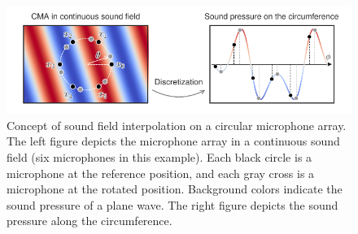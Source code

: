 \documentclass[sip,biber]{now-journal}
\begin{document}
\begin{figure}[t]
  \centering
  \includegraphics{figures/diagrams/sfi.pdf}
  \caption{%
    Concept of sound field interpolation on a circular microphone array.
    The left figure depicts the microphone array in a continuous sound field (six microphones in this example).
    Each black circle is a microphone at the reference position, and each gray cross is a microphone at the rotated position.
    Background colors indicate the sound pressure of a plane wave.
    The right figure depicts the sound pressure along the circumference.
  }%
  \label{fig:sfi}
\end{figure}
\end{document}
